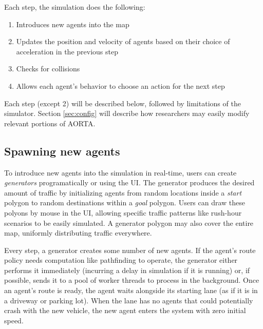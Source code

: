 \documentclass[letterpaper, 10 pt, conference]{ieeeconf}  %
\begin{document}
Each step, the simulation does the following:

\begin{enumerate}
  \item Introduces new agents into the map
  \item Updates the position and velocity of agents based on their choice of
        acceleration in the previous step
  \item Checks for collisions
  \item Allows each agent's behavior to choose an action for the next step
\end{enumerate}

Each step (except 2) will be described below, followed by limitations of the
simulator. Section \ref{sec:config} will describe how researchers may easily
modify relevant portions of AORTA.

\subsection{Spawning new agents}

To introduce new agents into the simulation in real-time, users can create
\emph{generators} programatically or using the UI. The generator produces the
desired amount of traffic by initializing agents from random locations inside a
\textit{start} polygon to random destinations within a \textit{goal} polygon.
Users can draw these polyons by mouse in the UI, allowing specific traffic
patterns like rush-hour scenarios to be easily simulated. A generator polygon
may also cover the entire map, uniformly distributing traffic everywhere.

Every step, a generator creates some number of new agents. If the agent's route
policy needs computation like pathfinding to operate, the generator either
performs it immediately (incurring a delay in simulation if it is running) or,
if possible, sends it to a pool of worker threads to process in the background.
Once an agent's route is ready, the agent waits alongside its starting lane (as
if it is in a driveway or parking lot). When the lane has no agents that could
potentially crash with the new vehicle, the new agent enters the system with
zero initial speed. %
\end{document}
